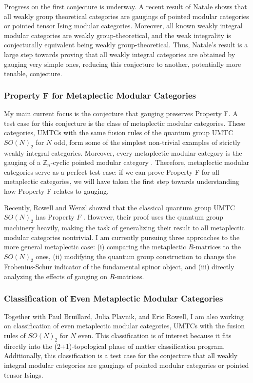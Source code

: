 \documentclass[12pt]{article}
\newcommand{\ZZ}{\mathbb{Z}}
\theoremstyle{plain} \numberwithin{equation}{section}
\theoremstyle{definition}
\begin{document}
Progress on the first conjecture is underway. A recent result of Natale \cite{n} shows that all weakly group theoretical categories are gaugings of pointed modular categories or pointed tensor Ising modular categories.  Moreover, all known weakly integral modular categories are weakly group-theoretical, and the weak integrality is conjecturally equivalent being weakly group-theoretical.  Thus, Natale's result is a large step towards proving that all weakly integral categories are obtained by gauging very simple ones, reducing this conjecture to another, potentially more tenable, conjecture.

\subsubsection*{Property F for Metaplectic Modular Categories}

My main current focus is the conjecture that gauging preserves Property F. A test case for this conjecture is the class of metaplectic modular categories.  These categories, UMTCs with the same fusion rules of the quantum group UMTC $SO(N)_2$ for $N$ odd,  form some of the simplest non-trivial examples of strictly weakly integral categories.   Moreover, every metaplectic modular category is the gauging of a $\ZZ_n$-cyclic pointed modular category \cite{acrw}.  Therefore, metaplectic modular categories serve as a perfect test case:  if we can prove Property F for all metaplectic categories, we will have taken the first step towards understanding how Property F relates to gauging.  

Recently,  Rowell and Wenzl showed that the classical quantum group UMTC $SO(N)_2$ has Property $F$ \cite{rw}.  However, their proof uses the quantum group machinery heavily, making the task of generalizing their result to all metaplectic modular categories nontrivial.  I am currently pursuing three approaches  to the more general metaplectic case: (i) comparing the metaplectic $R$-matrices to the $SO(N)_2$ ones, (ii) modifying the quantum group construction to change the Frobenius-Schur indicator of the fundamental spinor object, and (iii) directly analyzing the effects of gauging on $R$-matrices.

\subsubsection*{Classification of Even Metaplectic Modular Categories}

Together with Paul Bruillard, Julia Plavnik, and Eric Rowell, I am also working on classification of even metaplectic modular categories, UMTCs with the fusion rules of $SO(N)_2$ for $N$ even. This classification is of interest because it fits directly into the (2+1)-topological phase of matter classification program.  Additionally, this classification is a test case for the conjecture that all weakly integral modular categories are gaugings of pointed modular categories or pointed tensor Isings.
\end{document}
